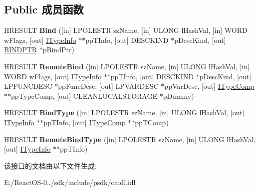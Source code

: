 \subsection*{Public 成员函数}
\begin{DoxyCompactItemize}
\item 
\mbox{\label{interface_i_type_comp_aad63f519da17c810d3028fae74711617}} 
H\+R\+E\+S\+U\+LT {\bfseries Bind} (\mbox{[}in\mbox{]} L\+P\+O\+L\+E\+S\+TR sz\+Name, \mbox{[}in\mbox{]} U\+L\+O\+NG l\+Hash\+Val, \mbox{[}in\mbox{]} W\+O\+RD w\+Flags, \mbox{[}out\mbox{]} \hyperlink{interface_i_type_info}{I\+Type\+Info} $\ast$$\ast$pp\+T\+Info, \mbox{[}out\mbox{]} D\+E\+S\+C\+K\+I\+ND $\ast$p\+Desc\+Kind, \mbox{[}out\mbox{]} \hyperlink{union_i_type_comp_1_1tag_b_i_n_d_p_t_r}{B\+I\+N\+D\+P\+TR} $\ast$p\+Bind\+Ptr)
\item 
\mbox{\label{interface_i_type_comp_a6d7e1daa8235004304b390f7ad7c7236}} 
H\+R\+E\+S\+U\+LT {\bfseries Remote\+Bind} (\mbox{[}in\mbox{]} L\+P\+O\+L\+E\+S\+TR sz\+Name, \mbox{[}in\mbox{]} U\+L\+O\+NG l\+Hash\+Val, \mbox{[}in\mbox{]} W\+O\+RD w\+Flags, \mbox{[}out\mbox{]} \hyperlink{interface_i_type_info}{I\+Type\+Info} $\ast$$\ast$pp\+T\+Info, \mbox{[}out\mbox{]} D\+E\+S\+C\+K\+I\+ND $\ast$p\+Desc\+Kind, \mbox{[}out\mbox{]} L\+P\+F\+U\+N\+C\+D\+E\+SC $\ast$pp\+Func\+Desc, \mbox{[}out\mbox{]} L\+P\+V\+A\+R\+D\+E\+SC $\ast$pp\+Var\+Desc, \mbox{[}out\mbox{]} \hyperlink{interface_i_type_comp}{I\+Type\+Comp} $\ast$$\ast$pp\+Type\+Comp, \mbox{[}out\mbox{]} C\+L\+E\+A\+N\+L\+O\+C\+A\+L\+S\+T\+O\+R\+A\+GE $\ast$p\+Dummy)
\item 
\mbox{\label{interface_i_type_comp_a789afde37679fb895b40d1f742006e77}} 
H\+R\+E\+S\+U\+LT {\bfseries Bind\+Type} (\mbox{[}in\mbox{]} L\+P\+O\+L\+E\+S\+TR sz\+Name, \mbox{[}in\mbox{]} U\+L\+O\+NG l\+Hash\+Val, \mbox{[}out\mbox{]} \hyperlink{interface_i_type_info}{I\+Type\+Info} $\ast$$\ast$pp\+T\+Info, \mbox{[}out\mbox{]} \hyperlink{interface_i_type_comp}{I\+Type\+Comp} $\ast$$\ast$pp\+T\+Comp)
\item 
\mbox{\label{interface_i_type_comp_a0de55a5ab02d3a207bee0589e616df91}} 
H\+R\+E\+S\+U\+LT {\bfseries Remote\+Bind\+Type} (\mbox{[}in\mbox{]} L\+P\+O\+L\+E\+S\+TR sz\+Name, \mbox{[}in\mbox{]} U\+L\+O\+NG l\+Hash\+Val, \mbox{[}out\mbox{]} \hyperlink{interface_i_type_info}{I\+Type\+Info} $\ast$$\ast$pp\+T\+Info)
\end{DoxyCompactItemize}


该接口的文档由以下文件生成\+:\begin{DoxyCompactItemize}
\item 
E\+:/\+React\+O\+S-\/0../sdk/include/psdk/oaidl.\+idl\end{DoxyCompactItemize}

